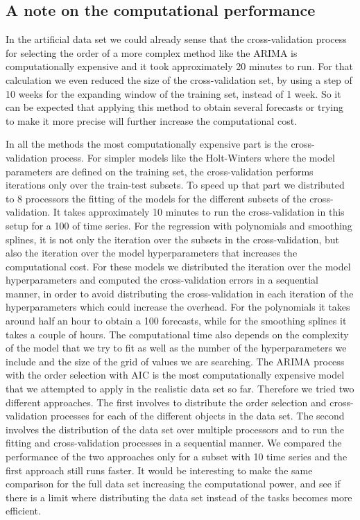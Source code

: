 \documentclass[12pt, letterpaper]{article}\usepackage[]{graphicx}\usepackage[]{color}
\begin{document}
\newpage

\subsection{A note on the computational performance}
In the artificial data set we could already sense that the cross-validation process for selecting the order of a more complex method like the ARIMA is computationally expensive and it took approximately 20 minutes to run. For that calculation we even reduced the size of the cross-validation set, by using a step of 10 weeks for the expanding window of the training set, instead of 1 week. So it can be expected that applying this method to obtain several forecasts or trying to make it more precise will further increase the computational cost.

In all the methods the most computationally expensive part is the cross-validation process. For simpler models like the Holt-Winters where the model parameters are defined on the training set, the cross-validation performs iterations only over the train-test subsets. To speed up that part we distributed to 8 processors the fitting of the models for the different subsets of the cross-validation. It takes approximately 10 minutes to run the cross-validation in this setup for a 100 of time series. For the regression with polynomials and smoothing splines, it is not only the iteration over the subsets in the cross-validation, but also the iteration over the model hyperparameters that increases the computational cost. For these models we distributed the iteration over the model hyperparameters and computed the cross-validation errors in a sequential manner, in order to avoid distributing the cross-validation in each iteration of the hyperparameters which could increase the overhead. For the polynomials it takes around half an hour to obtain a 100 forecasts, while for the smoothing splines it takes a couple of hours. The computational time also depends on the complexity of the model that we try to fit as well as the number of the hyperparameters we include and the size of the grid of values we are searching. The ARIMA process with the order selection with AIC is the most computationally expensive model that we attempted to apply in the realistic data set so far. Therefore we tried two different approaches. The first involves to distribute the order selection and cross-validation processes for each of the different objects in the data set. The second involves the distribution of the data set over multiple processors and to run the fitting and cross-validation processes in a sequential manner. We compared the performance of the two approaches only for a subset with 10 time series and the first approach still runs faster. It would be interesting to make the same comparison for the full data set increasing the computational power, and see if there is a limit where distributing the data set instead of the tasks becomes more efficient.
\end{document}
